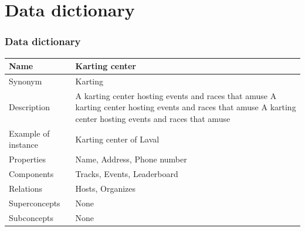 \documentclass{beamer}
\begin{document}
\section*{Data dictionary}
\begin{frame}
\frametitle{Data dictionary}


\begin{table}
\tiny
\begin{tabular}{|p{2cm}|p{6cm}|}
\hline
Name & \textbf{Karting center} \\
\hline
Synonym & Karting \\
\hline
Description & A karting center hosting events and races that amuse
A karting center hosting events and races that amuse
A karting center hosting events and races that amuse\\
\hline
Example of instance & Karting center of Laval\\
\hline
Properties & 
Name,
Address, 
Phone number \\
\hline
Components &
Tracks,
Events,
Leaderboard \\
\hline
Relations &
Hosts, 
Organizes \\
\hline
Superconcepts & None \\
\hline
Subconcepts & None \\
\hline
\end{tabular}
\end{table}

\end{frame}
\end{document}
